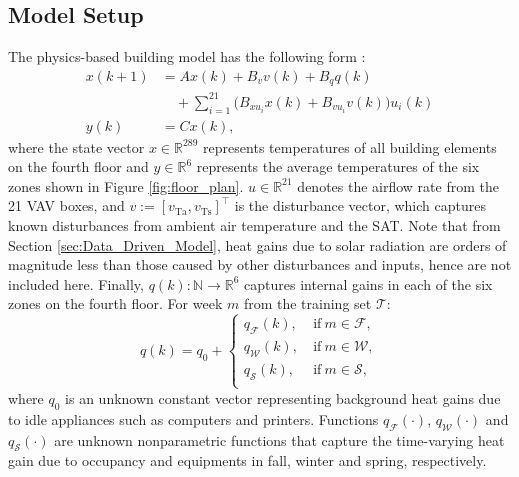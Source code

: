\subsection{Model Setup}\label{sec:physics_model}

The physics-based building model has the following form \cite{Qie}:
\begin{subequations}\label{eq:physics_model}
\begin{align}
x(k+1) &= Ax(k)+B_v v(k) + B_q q(k) \label{eq:physics_model1} \\ \nonumber
	& \quad + \textstyle \sum_{i=1}^{21} \big( B_{xu_i} x(k) + B_{vu_i} v(k) \big) u_i(k) \label{eq:physics_model_2} \\
y(k) &= C x(k),
\end{align}
\end{subequations}
where the state vector $x \in \mathbb{R}^{289}$ represents temperatures of all building elements on the fourth floor and $y \in \mathbb{R}^6$ represents the average temperatures of the six zones shown in Figure \ref{fig:floor_plan}. $u \in \mathbb{R}^{21}$ denotes the airflow rate from the 21 VAV boxes, and $v := [v_\text{Ta}, v_\text{Ts}]^\top$ is the disturbance vector, which captures known disturbances from ambient air temperature and the SAT. 
Note that from Section \ref{sec:Data_Driven_Model}, heat gains due to solar radiation are orders of magnitude less than those caused by other disturbances and inputs, hence are not included here. 
Finally, $q(k) : \mathbb{N} \rightarrow \mathbb{R}^6$ captures internal gains in each of the six zones on the fourth floor. For week $m$ from the training set $\mathcal{T}$:
\begin{equation}\label{eq:fig}
q(k) = q_0 + \begin{cases}
	q_{\mathcal{F}}(k), & ~\text{if} ~ m \in \mathcal{F}, \\
	q_{\mathcal{W}}(k), & ~\text{if} ~ m \in \mathcal{W}, \\
	q_{\mathcal{S}}(k), & ~\text{if} ~ m \in \mathcal{S}, \\
	\end{cases}
\end{equation}
where $q_0$ is an unknown constant vector representing background heat gains due to idle appliances such as computers and printers. Functions $q_{\mathcal{F}}(\cdot)$, $q_{\mathcal{W}}(\cdot)$ and $q_{\mathcal{S}}(\cdot)$ are unknown nonparametric functions that capture the time-varying heat gain due to occupancy and equipments in fall, winter and spring, respectively.
